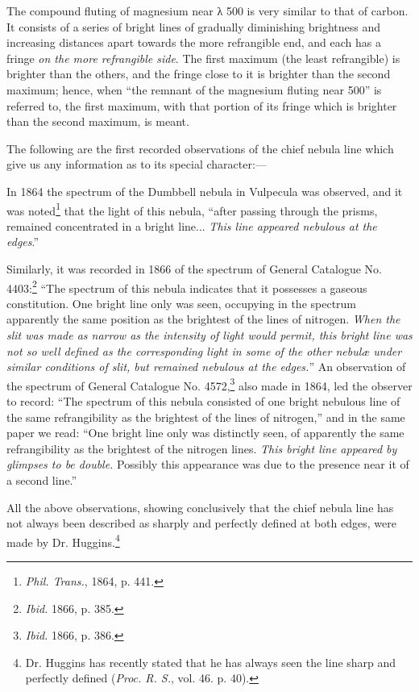 \documentclass[a4paper, 12pt, oneside, polutonikogreek, english]{article}
\begin{document}
The compound fluting of magnesium near λ 500 is very similar to that of carbon. It consists of a series of bright lines of gradually diminishing brightness and increasing distances apart towards the more refrangible end, and each has a fringe \emph{on the more refrangible side}. The first maximum (the least refrangible) is brighter than the others, and the fringe close to it is brighter than the second maximum; hence, when ``the remnant of the magnesium fluting near 500'' is referred to, the first maximum, with that portion of its fringe which is brighter than the second maximum, is meant.

The following are the first recorded observations of the chief nebula line which give us any information as to its special character:---

In 1864 the spectrum of the Dumbbell nebula in Vulpecula was observed, and it was noted\footnote{\emph{Phil. Trans.}, 1864, p. 441.} that the light of this nebula, ``after passing through the prisms, remained concentrated in a bright line... \emph{This line appeared nebulous at the edges}.''

Similarly, it was recorded in 1866 of the spectrum of General Catalogue No. 4403:\footnote{\emph{Ibid.} 1866, p. 385.} ``The spectrum of this nebula indicates that it possesses a gaseous constitution. One bright line only was seen, occupying in the spectrum apparently the same position as the brightest of the lines of nitrogen. \emph{When the slit was made as narrow as the intensity of light would permit, this bright line was not so well defined as the corresponding light in some of the other nebulæ under similar conditions of slit, but remained nebulous at the edges.}'' An observation of the spectrum of General Catalogue No. 4572,\footnote{\emph{Ibid.} 1866, p. 386.} also made in 1864, led the observer to record: ``The spectrum of this nebula consisted of one bright nebulous line of the same refrangibility as the brightest of the lines of nitrogen,'' and in the same paper we read: ``One bright line only was distinctly seen, of apparently the same refrangibility as the brightest of the nitrogen lines. \emph{This bright line appeared by glimpses to be double.} Possibly this appearance was due to the presence near it of a second line.''

All the above observations, showing conclusively that the chief nebula line has not always been described as sharply and perfectly defined at both edges, were made by Dr. Huggins.\footnote{Dr. Huggins has recently stated that he has always seen the line sharp and perfectly defined (\emph{Proc. R. S.}, vol. 46. p. 40).}
\end{document}
